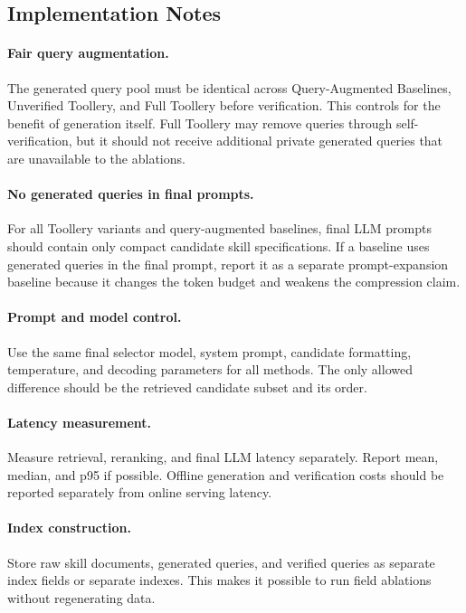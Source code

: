 \documentclass[11pt]{article}
\begin{document}
\subsection{Implementation Notes}
\label{subsec:implementation-notes}

\paragraph{Fair query augmentation.}
The generated query pool must be identical across Query-Augmented Baselines,
Unverified Toollery, and Full Toollery before verification. This controls for the
benefit of generation itself. Full Toollery may remove queries through
self-verification, but it should not receive additional private generated
queries that are unavailable to the ablations.

\paragraph{No generated queries in final prompts.}
For all Toollery variants and query-augmented baselines, final LLM prompts should
contain only compact candidate skill specifications. If a baseline uses
generated queries in the final prompt, report it as a separate prompt-expansion
baseline because it changes the token budget and weakens the compression claim.

\paragraph{Prompt and model control.}
Use the same final selector model, system prompt, candidate formatting,
temperature, and decoding parameters for all methods. The only allowed
difference should be the retrieved candidate subset and its order.

\paragraph{Latency measurement.}
Measure retrieval, reranking, and final LLM latency separately. Report mean,
median, and p95 if possible. Offline generation and verification costs should be
reported separately from online serving latency.

\paragraph{Index construction.}
Store raw skill documents, generated queries, and verified queries as separate
index fields or separate indexes. This makes it possible to run field ablations
without regenerating data.
\end{document}
